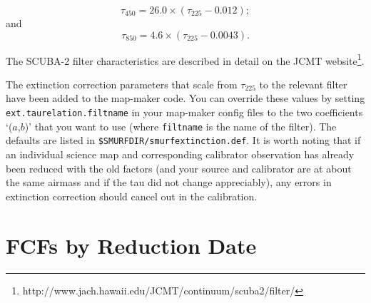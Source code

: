 \documentclass[twoside,11pt]{article}
\newcommand{\htmladdnormallinkfoot}[2]{#1\footnote{#2}}
\newcommand{\xlabel}[1]{}
\renewcommand{\_}{\texttt{\symbol{95}}}
\newcommand{\param}[1]{\texttt{#1}}
\begin{document}
\begin{equation}
\tau_{450} = 26.0 \times (\tau_{225} - 0.012);
\end{equation}
and
\begin{equation}
\tau_{850} = 4.6 \times (\tau_{225} - 0.0043).
\end{equation}

The SCUBA-2 filter characteristics are described in
detail \htmladdnormallinkfoot{on the JCMT
website}{http://www.jach.hawaii.edu/JCMT/continuum/scuba2/filter/}.

The extinction correction parameters that scale from $\tau_{225}$ to
the relevant filter have been added to the map-maker code. You can
override these values by setting \param{ext.taurelation.filtname} in
your map-maker config files to the two coefficients `($a$,$b$)' that you
want to use (where \texttt{filtname} is the name of the filter). The
defaults are listed in \texttt{\$SMURF\_DIR/smurf\_extinction.def}.
It is worth noting that if an
individual science map and corresponding calibrator observation has
already been reduced with the old factors (and your source and
calibrator are at about the same airmass and if the tau did not change
appreciably), any errors in extinction correction should cancel out in
the calibration.

\newpage
\section{\xlabel{fcfsred}FCFs by Reduction Date}
\label{app:fcfs}
\end{document}
